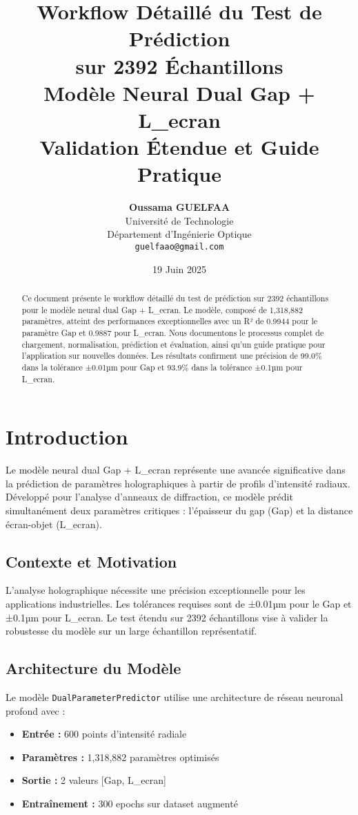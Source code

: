 \documentclass[10pt,twocolumn]{article}
\title{\color{darkblue}\textbf{Workflow Détaillé du Test de Prédiction\\sur 2392 Échantillons}\\
\large\color{lightblue}Modèle Neural Dual Gap + L\_ecran\\
Validation Étendue et Guide Pratique}
\author{
\textbf{Oussama GUELFAA}\\
\small Université de Technologie\\
\small Département d'Ingénierie Optique\\
\small \texttt{guelfaao@gmail.com}
}
\date{\color{darkblue}19 Juin 2025}
\begin{document}
\maketitle

\begin{abstract}
\color{darkblue}
Ce document présente le workflow détaillé du test de prédiction sur 2392 échantillons pour le modèle neural dual Gap + L\_ecran. Le modèle, composé de 1,318,882 paramètres, atteint des performances exceptionnelles avec un R² de 0.9944 pour le paramètre Gap et 0.9887 pour L\_ecran. Nous documentons le processus complet de chargement, normalisation, prédiction et évaluation, ainsi qu'un guide pratique pour l'application sur nouvelles données. Les résultats confirment une précision de 99.0\% dans la tolérance ±0.01µm pour Gap et 93.9\% dans la tolérance ±0.1µm pour L\_ecran.
\end{abstract}

\section{Introduction}

Le modèle neural dual Gap + L\_ecran représente une avancée significative dans la prédiction de paramètres holographiques à partir de profils d'intensité radiaux. Développé pour l'analyse d'anneaux de diffraction, ce modèle prédit simultanément deux paramètres critiques : l'épaisseur du gap (Gap) et la distance écran-objet (L\_ecran).

\subsection{Contexte et Motivation}

L'analyse holographique nécessite une précision exceptionnelle pour les applications industrielles. Les tolérances requises sont de ±0.01µm pour le Gap et ±0.1µm pour L\_ecran. Le test étendu sur 2392 échantillons vise à valider la robustesse du modèle sur un large échantillon représentatif.

\subsection{Architecture du Modèle}

Le modèle \texttt{DualParameterPredictor} utilise une architecture de réseau neuronal profond avec :
\begin{itemize}
    \item \textbf{Entrée :} 600 points d'intensité radiale
    \item \textbf{Paramètres :} 1,318,882 paramètres optimisés
    \item \textbf{Sortie :} 2 valeurs [Gap, L\_ecran]
    \item \textbf{Entraînement :} 300 epochs sur dataset augmenté
\end{itemize}
\end{document}
